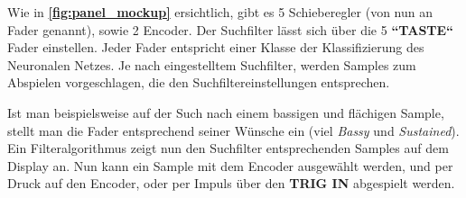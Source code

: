 	
	Wie in \textbf{\autoref{fig:panel_mockup}} ersichtlich, gibt es 5 Schieberegler (von nun an Fader genannt), sowie 2 Encoder.
	Der Suchfilter lässt sich über die 5 \textbf{``TASTE``} Fader einstellen. 
	Jeder Fader entspricht einer Klasse der Klassifizierung des Neuronalen Netzes.
	Je nach eingestelltem Suchfilter, werden Samples zum Abspielen vorgeschlagen, die den Suchfiltereinstellungen entsprechen.
	
	Ist man beispielsweise auf der Such nach einem bassigen und flächigen Sample, stellt man die Fader entsprechend seiner Wünsche ein (viel \textit{Bassy} und \textit{Sustained}). 
	Ein Filteralgorithmus zeigt nun den Suchfilter entsprechenden Samples auf dem Display an.
	Nun kann ein Sample mit dem Encoder ausgewählt werden, und per Druck auf den Encoder, oder per Impuls über den \textbf{TRIG IN} abgespielt werden. 
	
	
	
	
	
	
